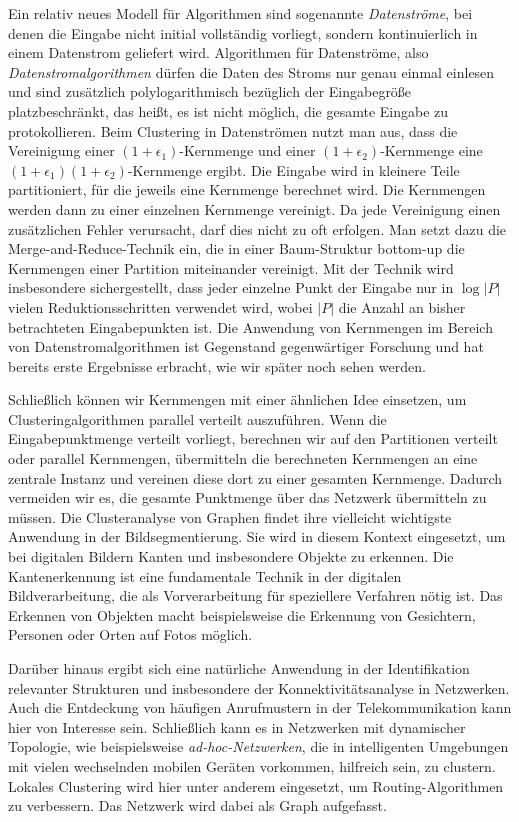 Ein relativ neues Modell für Algorithmen sind sogenannte \emph{Datenströme}, bei denen die Eingabe nicht initial vollständig
vorliegt, sondern kontinuierlich in einem Datenstrom geliefert wird. Algorithmen für Datenströme, also
\emph{Datenstromalgorithmen} dürfen die Daten des Stroms nur genau einmal einlesen und sind zusätzlich polylogarithmisch
bezüglich der Eingabegröße platzbeschränkt, das heißt, es ist nicht möglich, die gesamte Eingabe zu protokollieren.
Beim Clustering in Datenströmen nutzt man aus, dass die Vereinigung einer $(1 + \epsilon_1)$-Kernmenge und einer
$(1 + \epsilon_2)$-Kernmenge eine $(1 + \epsilon_1) (1 + \epsilon_2)$-Kernmenge ergibt. Die Eingabe wird in kleinere Teile
partitioniert, für die jeweils eine Kernmenge berechnet wird. Die Kernmengen werden dann zu einer einzelnen Kernmenge
vereinigt. Da jede Vereinigung einen zusätzlichen Fehler verursacht, darf dies nicht zu oft erfolgen. Man setzt dazu die
Merge-and-Reduce-Technik ein, die in einer Baum-Struktur bottom-up die Kernmengen einer Partition miteinander vereinigt.
Mit der Technik wird insbesondere sichergestellt, dass jeder einzelne Punkt der Eingabe nur in $\log \left|P\right|$ vielen
Reduktionsschritten verwendet wird, wobei $\left|P\right|$ die Anzahl an bisher betrachteten Eingabepunkten ist.
Die Anwendung von Kernmengen im Bereich von
Datenstromalgorithmen ist Gegenstand gegenwärtiger Forschung und hat bereits erste Ergebnisse erbracht, wie wir später noch
sehen werden.

Schließlich können wir Kernmengen mit einer ähnlichen Idee einsetzen, um Clusteringalgorithmen parallel verteilt auszuführen.
Wenn die Eingabepunktmenge verteilt vorliegt, berechnen wir auf den Partitionen verteilt oder parallel Kernmengen, übermitteln die
berechneten Kernmengen an eine zentrale Instanz und vereinen diese dort zu einer gesamten Kernmenge. Dadurch vermeiden wir es,
die gesamte Punktmenge über das Netzwerk übermitteln zu müssen.
\absatz
Die Clusteranalyse von Graphen findet ihre vielleicht wichtigste Anwendung in der Bildsegmentierung. Sie wird in diesem
Kontext eingesetzt, um bei digitalen Bildern Kanten und insbesondere Objekte zu erkennen. Die Kantenerkennung ist eine
fundamentale Technik in der digitalen Bildverarbeitung, die als Vorverarbeitung für speziellere Verfahren nötig ist. Das Erkennen
von Objekten macht beispielsweise die Erkennung von Gesichtern, Personen oder Orten auf Fotos möglich.

Darüber hinaus ergibt sich eine natürliche Anwendung in der Identifikation relevanter Strukturen und insbesondere der
Konnektivitätsanalyse in Netzwerken. Auch die Entdeckung von häufigen Anrufmustern in der Telekommunikation kann hier
von Interesse sein. Schließlich kann es in Netzwerken mit dynamischer Topologie, wie beispielsweise \emph{ad-hoc-Netzwerken},
die in intelligenten Umgebungen mit vielen wechselnden mobilen Geräten vorkommen, hilfreich sein, zu clustern. Lokales Clustering
wird hier unter anderem eingesetzt, um Routing-Algorithmen zu verbessern. Das Netzwerk wird dabei als Graph aufgefasst.

